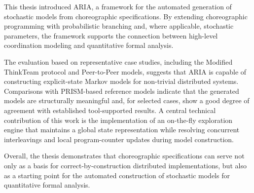 This thesis introduced \textsc{ARIA}, a framework for the automated generation of stochastic models from choreographic specifications. By extending choreographic programming with probabilistic branching and, where applicable, stochastic parameters, the framework supports the connection between high-level coordination modeling and quantitative formal analysis.

The evaluation based on representative case studies, including the Modified ThinkTeam protocol and Peer-to-Peer models, suggests that \textsc{ARIA} is capable of constructing explicit-state Markov models for non-trivial distributed systems. Comparisons with PRISM-based reference models indicate that the generated models are structurally meaningful and, for selected cases, show a good degree of agreement with established tool-supported results. A central technical contribution of this work is the implementation of an on-the-fly exploration engine that maintains a global state representation while resolving concurrent interleavings and local program-counter updates during model construction.

Overall, the thesis demonstrates that choreographic specifications can serve not only as a basis for correct-by-construction distributed implementations, but also as a starting point for the automated construction of stochastic models for quantitative formal analysis.

